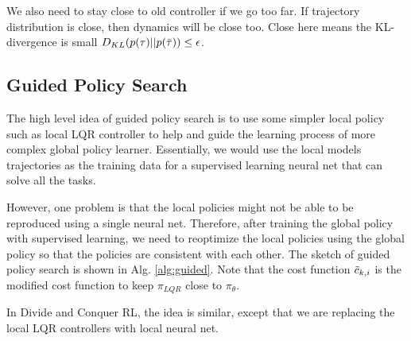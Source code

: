 We also need to stay close to old controller if we go too far. If trajectory distribution is close, then dynamics will be close too. Close here means the KL-divergence is small $D_{KL}(p(\tau)||p(\Bar{\tau}))\leq \epsilon$.


\subsection{Guided Policy Search}
The high level idea of guided policy search is to use some simpler local policy such as local LQR controller to help and guide the learning process of more complex global policy learner. Essentially, we would use the local models trajectories as the training data for a supervised learning neural net that can solve all the tasks.

However, one problem is that the local policies might not be able to be reproduced using a single neural net. Therefore, after training the global policy with supervised learning, we need to reoptimize the local policies using the global policy so that the policies are consistent with each other. The sketch of guided policy search is shown in Alg. \ref{alg:guided}. Note that the cost function $\Tilde{c}_{k,i}$ is the modified cost function to keep $\pi_{LQR}$ close to $\pi_\theta$.


In Divide and Conquer RL, the idea is similar, except that we are replacing the local LQR controllers with local neural net. 
